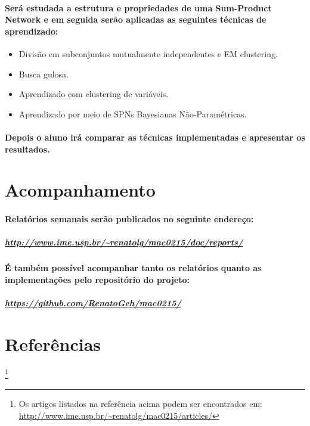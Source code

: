 \documentclass[a4paper,10pt]{article}
\newcommand\blfootnote[1]{%
  \begingroup
  \renewcommand\thefootnote{}\footnote{#1}%
  \addtocounter{footnote}{-1}%
  \endgroup
}
\theoremstyle{plain}
\begin{document}
\paragraph{
  Será estudada a estrutura e propriedades de uma Sum-Product Network e em seguida serão
aplicadas as seguintes técnicas de aprendizado:
}

\begin{itemize} \itemsep0pt
  \item Divisão em subconjuntos mutualmente independentes e EM clustering.\cite{gens-domingos}  
  \item Busca gulosa.\cite{greedy-search}
  \item Aprendizado com clustering de variáveis.\cite{clustering}
  \item Aprendizado por meio de SPNs Bayesianas Não-Paramétricas.\cite{non-parametric-bayesian}
\end{itemize}

\paragraph{
  Depois o aluno irá comparar as técnicas implementadas e apresentar os resultados.
}

\section{Acompanhamento}

\paragraph{
  Relatórios semanais serão publicados no seguinte endereço: 
}

\subparagraph{\url{http://www.ime.usp.br/~renatolg/mac0215/doc/reports/}}

\paragraph{
  É também possível acompanhar tanto os relatórios quanto as implementações pelo repositório
do projeto:
}

\subparagraph{\url{https://github.com/RenatoGeh/mac0215/}}

\newpage

\section{Referências}

\printbibliography[title={Artigos},type=article]
\printbibliography[title={Websites},type=misc]

\blfootnote{Os artigos listados na referência acima podem ser encontrados em: 
  \url{http://www.ime.usp.br/~renatolg/mac0215/articles/}}
\end{document}
